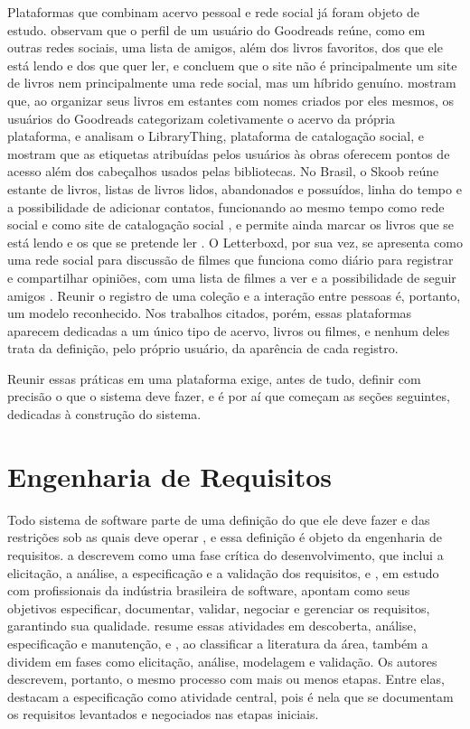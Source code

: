 Plataformas que combinam acervo pessoal e rede social já foram objeto de estudo.  observam que o perfil de um usuário do Goodreads
reúne, como em outras redes sociais, uma lista de amigos, além dos livros favoritos, dos que ele está lendo e dos que quer ler, e concluem que o site não é
principalmente um site de livros nem principalmente uma rede social, mas um híbrido genuíno.  mostram que, ao organizar seus livros em
estantes com nomes criados por eles mesmos, os usuários do Goodreads categorizam coletivamente o acervo da própria plataforma, e 
analisam o LibraryThing, plataforma de catalogação social, e mostram que as etiquetas atribuídas pelos usuários às obras oferecem pontos de acesso além dos
cabeçalhos usados pelas bibliotecas. No Brasil, o Skoob reúne estante de livros, listas de livros lidos, abandonados e possuídos, linha do tempo e a
possibilidade de adicionar contatos, funcionando ao mesmo tempo como rede social e como site de catalogação social \cite{Damasceno2022}, e permite
ainda marcar os livros que se está lendo e os que se pretende ler \cite{Monteiro2020}. O Letterboxd, por sua vez, se apresenta como uma rede social para
discussão de filmes que funciona como diário para registrar e compartilhar opiniões, com uma lista de filmes a ver e a possibilidade de seguir amigos
\cite{Leite2025}. Reunir o registro de uma coleção e a interação entre pessoas é, portanto, um modelo reconhecido. Nos trabalhos citados, porém, essas plataformas
aparecem dedicadas a um único tipo de acervo, livros ou filmes, e nenhum deles trata da definição, pelo próprio usuário, da aparência de cada registro.

Reunir essas práticas em uma plataforma exige, antes de tudo, definir com precisão o que o sistema deve fazer, e é por aí que começam as seções seguintes,
dedicadas à construção do sistema.


\section{Engenharia de Requisitos}
\label{sec:engenharia-requisitos}

Todo sistema de software parte de uma definição do que ele deve fazer e das restrições sob as quais deve operar \cite{Valente2020}, e essa definição é
objeto da engenharia de requisitos.  a descrevem como uma fase crítica do desenvolvimento, que inclui a elicitação, a análise, a
especificação e a validação dos requisitos, e , em estudo com profissionais da indústria brasileira de software, apontam como
seus objetivos especificar, documentar, validar, negociar e gerenciar os requisitos, garantindo sua qualidade.  resume essas
atividades em descoberta, análise, especificação e manutenção, e , ao classificar a literatura da área, também a dividem em fases como
elicitação, análise, modelagem e validação. Os autores descrevem, portanto, o mesmo processo com mais ou menos etapas. Entre elas,
 destacam a especificação como atividade central, pois é nela que se documentam os requisitos levantados e negociados nas
etapas iniciais.

